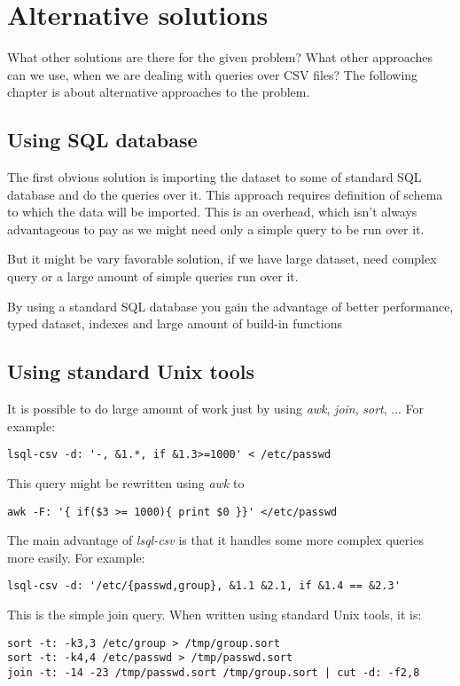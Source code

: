 
\chapter{Alternative solutions}
What other solutions are there for the given problem? What other approaches can we use, when we are dealing with queries over CSV files? 
The following chapter is about alternative approaches to the problem.

\section{Using SQL database}
The first obvious solution is importing the dataset to some of standard SQL database and do the queries over it. 
This approach requires definition of schema to which the data will be imported. This is an overhead, which isn't
always advantageous to pay as we might need only a simple query to be run over it.

But it might be vary favorable solution, if we have large dataset, need complex query or a large amount of simple queries run over it.

By using a standard SQL database you gain the advantage of better performance, typed dataset, indexes and large amount of build-in functions

\section{Using standard Unix tools}
It is possible to do large amount of work just by using \textit{awk}, \textit{join}, \textit{sort}, ...
For example:

\begin{verbatim}
lsql-csv -d: '-, &1.*, if &1.3>=1000' < /etc/passwd
\end{verbatim}

This query might be rewritten using \textit{awk} to
\begin{verbatim}
awk -F: '{ if($3 >= 1000){ print $0 }}' </etc/passwd
\end{verbatim}

The main advantage of \textit{lsql-csv} is that it handles some more complex queries more easily. For example:
\begin{verbatim}
lsql-csv -d: '/etc/{passwd,group}, &1.1 &2.1, if &1.4 == &2.3'
\end{verbatim}

This is the simple join query. When written using standard Unix tools, it is:
\begin{verbatim}
sort -t: -k3,3 /etc/group > /tmp/group.sort
sort -t: -k4,4 /etc/passwd > /tmp/passwd.sort
join -t: -14 -23 /tmp/passwd.sort /tmp/group.sort | cut -d: -f2,8 
\end{verbatim}


